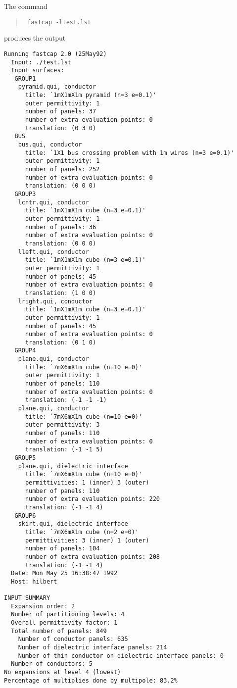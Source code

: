 The command 
\begin{quote}\tt
fastcap -ltest.lst
\end{quote}
produces the output
\begin{verbatim}
Running fastcap 2.0 (25May92)
  Input: ./test.lst
  Input surfaces:
   GROUP1
    pyramid.qui, conductor
      title: `1mX1mX1m pyramid (n=3 e=0.1)'
      outer permittivity: 1
      number of panels: 37
      number of extra evaluation points: 0
      translation: (0 3 0)
   BUS
    bus.qui, conductor
      title: `1X1 bus crossing problem with 1m wires (n=3 e=0.1)'
      outer permittivity: 1
      number of panels: 252
      number of extra evaluation points: 0
      translation: (0 0 0)
   GROUP3
    lcntr.qui, conductor
      title: `1mX1mX1m cube (n=3 e=0.1)'
      outer permittivity: 1
      number of panels: 36
      number of extra evaluation points: 0
      translation: (0 0 0)
    lleft.qui, conductor
      title: `1mX1mX1m cube (n=3 e=0.1)'
      outer permittivity: 1
      number of panels: 45
      number of extra evaluation points: 0
      translation: (1 0 0)
    lright.qui, conductor
      title: `1mX1mX1m cube (n=3 e=0.1)'
      outer permittivity: 1
      number of panels: 45
      number of extra evaluation points: 0
      translation: (0 1 0)
   GROUP4
    plane.qui, conductor
      title: `7mX6mX1m cube (n=10 e=0)'
      outer permittivity: 1
      number of panels: 110
      number of extra evaluation points: 0
      translation: (-1 -1 -1)
    plane.qui, conductor
      title: `7mX6mX1m cube (n=10 e=0)'
      outer permittivity: 3
      number of panels: 110
      number of extra evaluation points: 0
      translation: (-1 -1 5)
   GROUP5
    plane.qui, dielectric interface
      title: `7mX6mX1m cube (n=10 e=0)'
      permittivities: 1 (inner) 3 (outer)
      number of panels: 110
      number of extra evaluation points: 220
      translation: (-1 -1 4)
   GROUP6
    skirt.qui, dielectric interface
      title: `7mX6mX1m cube (n=2 e=0)'
      permittivities: 3 (inner) 1 (outer)
      number of panels: 104
      number of extra evaluation points: 208
      translation: (-1 -1 4)
  Date: Mon May 25 16:38:47 1992
  Host: hilbert

INPUT SUMMARY
  Expansion order: 2
  Number of partitioning levels: 4
  Overall permittivity factor: 1
  Total number of panels: 849
    Number of conductor panels: 635
    Number of dielectric interface panels: 214
    Number of thin conductor on dielectric interface panels: 0
  Number of conductors: 5
No expansions at level 4 (lowest)
Percentage of multiplies done by multipole: 83.2%


\end{verbatim}
